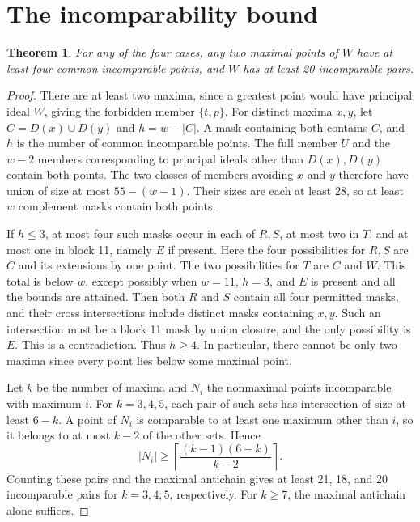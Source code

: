 \documentclass[10pt]{article}
\newtheorem{theorem}{Theorem}
\begin{document}
\section{The incomparability bound}
\begin{theorem}
For any of the four cases, any two maximal points of \(W\) have at
least four common incomparable points, and \(W\) has at least
20 incomparable pairs.
\end{theorem}
\begin{proof}
There are at least two maxima, since a greatest point would have
principal ideal \(W\), giving the forbidden member \(\{t,p\}\).
For distinct maxima \(x,y\), let \(C=D(x)\cup D(y)\) and
\(h=w-|C|\). A mask containing both contains \(C\), and \(h\) is the
number of common incomparable points. The full member \(U\) and
the \(w-2\) members corresponding to principal ideals other than
\(D(x),D(y)\) contain both points. The two classes of members
avoiding \(x\) and \(y\) therefore have union of size at most
\(55-(w-1)\). Their sizes are each at least 28, so at least \(w\)
complement masks contain both points.

If \(h\le3\), at most four such masks occur in each of \(R,S\), at
most two in \(T\), and at most one in block 11, namely \(E\) if present.
Here the four possibilities for \(R,S\) are \(C\) and its extensions
by one point. The two possibilities for \(T\) are \(C\) and \(W\).
This total is below \(w\), except possibly when \(w=11\), \(h=3\), and
\(E\) is present and all the bounds are attained. Then both \(R\)
and \(S\) contain all four permitted masks, and their cross
intersections include distinct masks containing \(x,y\). Such an
intersection must be a block 11 mask by union closure, and the
only possibility is \(E\). This is a contradiction. Thus \(h\ge4\).
In particular, there cannot be only two maxima since every point
lies below some maximal point.

Let \(k\) be the number of maxima and \(N_i\) the nonmaximal points
incomparable with maximum \(i\). For \(k=3,4,5\), each pair of such sets
has intersection of size at least \(6-k\). A point of \(N_i\)
is comparable to at least one maximum other than \(i\), so it belongs
to at most \(k-2\) of the other sets. Hence
\[
|N_i|\ge\left\lceil\frac{(k-1)(6-k)}{k-2}\right\rceil.
\]
Counting these pairs and the maximal antichain gives at least
21, 18, and 20 incomparable pairs for \(k=3,4,5\), respectively.
For \(k\ge7\), the maximal antichain alone suffices.


\end{proof}
\end{document}
